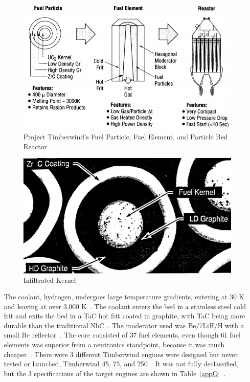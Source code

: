 \documentclass{article}
\begin{document}
\begin{figure}[]
	\centering
	\includegraphics[height=0.45\textheight]{fig/appM}
	\caption[Project Timberwind's Fuel Particle, Fuel Element, and Particle Bed Reactor]{Project Timberwind's Fuel Particle, Fuel Element, and Particle Bed Reactor~\cite{ludewig1996design}}
	\label{appM}
\end{figure}

\begin{figure}[]
	\centering
	\includegraphics[height=0.35\textheight]{fig/appN}
	\caption[Infiltrated Kernel]{Infiltrated Kernel~\cite{haslett1995space}}
	\label{appN}
\end{figure}

The coolant, hydrogen, undergoes large temperature gradients, entering at 30 K and leaving at over 3,000 K~\cite{ludewig1996design}. The coolant enters the bed in a stainless steel cold frit and exits the bed in a TaC hot frit coated in graphite, with TaC being more durable than the traditional NbC~\cite{ludewig1996design}. The moderator used was Be/7LiH/H with a small Be reflector~\cite{haslett1995space}. The core consisted of 37 fuel elements, even though 61 fuel elements was superior from a neutronics standpoint, because it was much cheaper~\cite{haslett1995space}. 
There were 3 different Timberwind engines were designed but never tested or launched, Timberwind 45, 75, and 250~\cite{board2006priorities}. It was not fully declassified, but the 3 specifications of the target engines are shown in Table~\ref{appO}~\cite{board2006priorities}.
\end{document}

